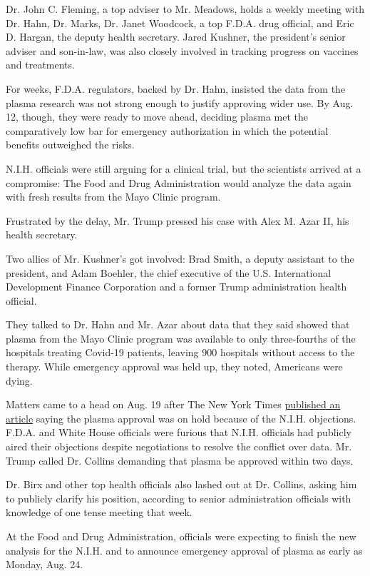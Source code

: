 Dr. John C. Fleming, a top adviser to Mr. Meadows, holds a weekly
meeting with Dr. Hahn, Dr. Marks, Dr. Janet Woodcock, a top F.D.A. drug
official, and Eric D. Hargan, the deputy health secretary. Jared
Kushner, the president's senior adviser and son-in-law, was also closely
involved in tracking progress on vaccines and treatments.

For weeks, F.D.A. regulators, backed by Dr. Hahn, insisted the data from
the plasma research was not strong enough to justify approving wider
use. By Aug. 12, though, they were ready to move ahead, deciding plasma
met the comparatively low bar for emergency authorization in which the
potential benefits outweighed the risks.

N.I.H. officials were still arguing for a clinical trial, but the
scientists arrived at a compromise: The Food and Drug Administration
would analyze the data again with fresh results from the Mayo Clinic
program.

Frustrated by the delay, Mr. Trump pressed his case with Alex M. Azar
II, his health secretary.

Two allies of Mr. Kushner's got involved: Brad Smith, a deputy assistant
to the president, and Adam Boehler, the chief executive of the U.S.
International Development Finance Corporation and a former Trump
administration health official.

They talked to Dr. Hahn and Mr. Azar about data that they said showed
that plasma from the Mayo Clinic program was available to only
three-fourths of the hospitals treating Covid-19 patients, leaving 900
hospitals without access to the therapy. While emergency approval was
held up, they noted, Americans were dying.

Matters came to a head on Aug. 19 after The New York Times
\href{https://www.nytimes3xbfgragh.onion/2020/08/19/us/politics/blood-plasma-covid-19.html}{published
an article} saying the plasma approval was on hold because of the N.I.H.
objections. F.D.A. and White House officials were furious that N.I.H.
officials had publicly aired their objections despite negotiations to
resolve the conflict over data. Mr. Trump called Dr. Collins demanding
that plasma be approved within two days.

Dr. Birx and other top health officials also lashed out at Dr. Collins,
asking him to publicly clarify his position, according to senior
administration officials with knowledge of one tense meeting that week.

At the Food and Drug Administration, officials were expecting to finish
the new analysis for the N.I.H. and to announce emergency approval of
plasma as early as Monday, Aug. 24.

